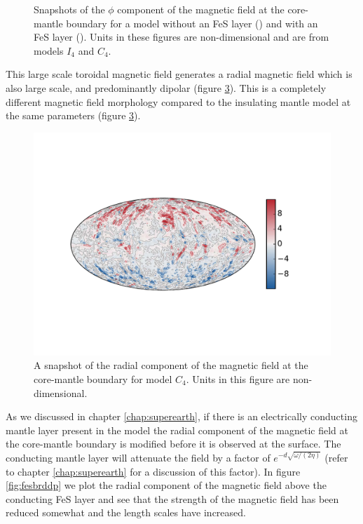 \begin{figure}
\begin{subfigure}{.8\textwidth}
	        \caption{ \label{fig:fesbph}}
        \end{subfigure}
        \caption{Snapshots of the $\phi$ component of the magnetic field at the core-mantle boundary for a model without an FeS layer () and with an FeS layer (). Units in these figures are non-dimensional and are from models $I_4$ and $C_4$.} 
        \label{fig:bph}
\end{figure}

This large scale toroidal magnetic field generates a radial magnetic field which is also large scale, and predominantly dipolar (figure \ref{fig:fesbrcmb}). This is a completely different magnetic field morphology compared to the insulating mantle model at the same parameters (figure \ref{fig:fesbrcmb}).
\begin{figure}
	\centering
	\includegraphics[width=.8\linewidth]{Chapter5/Figures/br11_004_1631_100.pdf}	
	\caption{A snapshot of the radial component of the magnetic field at the core-mantle boundary for model $C_4$. Units in this figure are non-dimensional.}
	\label{fig:fesbrcmb}
\end{figure}
As we discussed in chapter \ref{chap:superearth}, if there is an electrically conducting mantle layer present in the model the radial component of the magnetic field at the core-mantle boundary is modified before it is observed at the surface. The conducting mantle layer will attenuate the field by a factor of $e^{-d\sqrt{\omega/(2 \eta)}}$ (refer to chapter \ref{chap:superearth} for a discussion of this factor). In figure \ref{fig:fesbrddp} we plot the radial component of the magnetic field above the conducting FeS layer and see that the strength of the magnetic field has been reduced somewhat and the length scales have increased.
